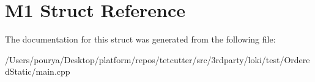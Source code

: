 \hypertarget{structM1}{}\section{M1 Struct Reference}
\label{structM1}


The documentation for this struct was generated from the following file\+:\begin{DoxyCompactItemize}
\item 
/\+Users/pourya/\+Desktop/platform/repos/tetcutter/src/3rdparty/loki/test/\+Ordered\+Static/main.\+cpp\end{DoxyCompactItemize}
